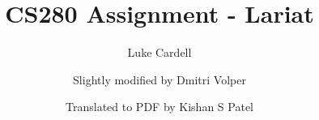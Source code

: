 \documentclass{article}
\title{CS280 Assignment - Lariat}
\date{ }
\author[1]{Luke Cardell}
\author[2]{Slightly modified by Dmitri Volper}
\author[3]{Translated to PDF by Kishan S Patel}
\affil[1]{Digipen Institute of Technology}
\begin{document}
\maketitle


\pagebreak
\tableofcontents
\pagebreak




\end{document}
